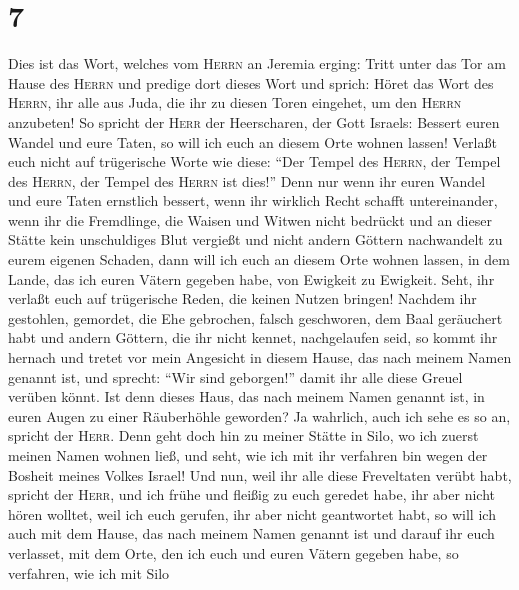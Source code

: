 \hypertarget{section-6}{%
\section{7}\label{section-6}}

 Dies ist das Wort, welches vom \textsc{Herrn} an Jeremia
erging:  Tritt unter das Tor am Hause des \textsc{Herrn}
und predige dort dieses Wort und sprich: Höret das Wort des
\textsc{Herrn}, ihr alle aus Juda, die ihr zu diesen Toren eingehet, um
den \textsc{Herrn} anzubeten!  So spricht der
\textsc{Herr} der Heerscharen, der Gott Israels: Bessert euren Wandel
und eure Taten, so will ich euch an diesem Orte wohnen lassen!
 Verlaßt euch nicht auf trügerische Worte wie diese: ``Der
Tempel des \textsc{Herrn}, der Tempel des \textsc{Herrn}, der Tempel des
\textsc{Herrn} ist dies!''  Denn nur wenn ihr euren Wandel
und eure Taten ernstlich bessert, wenn ihr wirklich Recht schafft
untereinander,  wenn ihr die Fremdlinge, die Waisen und
Witwen nicht bedrückt und an dieser Stätte kein unschuldiges Blut
vergießt und nicht andern Göttern nachwandelt zu eurem eigenen Schaden,
 dann will ich euch an diesem Orte wohnen lassen, in dem
Lande, das ich euren Vätern gegeben habe, von Ewigkeit zu Ewigkeit.
 Seht, ihr verlaßt euch auf trügerische Reden, die keinen
Nutzen bringen!  Nachdem ihr gestohlen, gemordet, die Ehe
gebrochen, falsch geschworen, dem Baal geräuchert habt und andern
Göttern, die ihr nicht kennet, nachgelaufen seid,  so
kommt ihr hernach und tretet vor mein Angesicht in diesem Hause, das
nach meinem Namen genannt ist, und sprecht: ``Wir sind geborgen!'' damit
ihr alle diese Greuel verüben könnt.  Ist denn dieses
Haus, das nach meinem Namen genannt ist, in euren Augen zu einer
Räuberhöhle geworden? Ja wahrlich, auch ich sehe es so an, spricht der
\textsc{Herr}.  Denn geht doch hin zu meiner Stätte in
Silo, wo ich zuerst meinen Namen wohnen ließ, und seht, wie ich mit ihr
verfahren bin wegen der Bosheit meines Volkes Israel! 
Und nun, weil ihr alle diese Freveltaten verübt habt, spricht der
\textsc{Herr}, und ich frühe und fleißig zu euch geredet habe, ihr aber
nicht hören wolltet, weil ich euch gerufen, ihr aber nicht geantwortet
habt,  so will ich auch mit dem Hause, das nach meinem
Namen genannt ist und darauf ihr euch verlasset, mit dem Orte, den ich
euch und euren Vätern gegeben habe, so verfahren, wie ich mit Silo
